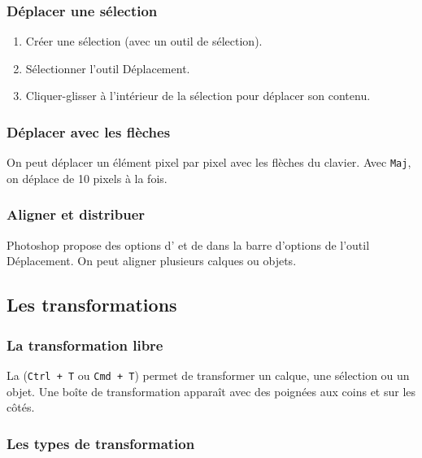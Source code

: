 \subsubsection{Déplacer une sélection}

\begin{enumerate}
    \item Créer une sélection (avec un outil de sélection).
    \item Sélectionner l'outil Déplacement.
    \item Cliquer-glisser à l'intérieur de la sélection pour déplacer son contenu.
\end{enumerate}

\subsubsection{Déplacer avec les flèches}

On peut déplacer un élément pixel par pixel avec les flèches du clavier. Avec \texttt{Maj}, on déplace de 10 pixels à la fois.

\subsubsection{Aligner et distribuer}

Photoshop propose des options d' et de  dans la barre d'options de l'outil Déplacement. On peut aligner plusieurs calques ou objets.

\subsection{Les transformations}

\subsubsection{La transformation libre}

La  (\texttt{Ctrl + T} ou \texttt{Cmd + T}) permet de transformer un calque, une sélection ou un objet. Une boîte de transformation apparaît avec des poignées aux coins et sur les côtés.

\subsubsection{Les types de transformation}


